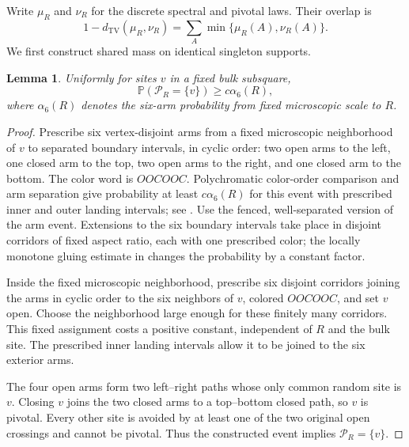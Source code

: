 \documentclass[11pt]{amsart}
\newtheorem{lemma}[theorem]{Lemma}
\theoremstyle{remark}
\newcommand{\Prob}{\mathbb P}
\newcommand{\cP}{\mathcal P}
\newcommand{\TV}{d_{\mathrm{TV}}}
\begin{document}
Write $\mu_R$ and $\nu_R$ for the discrete spectral and pivotal laws. Their overlap is
\begin{equation}\label{eq:overlap}
 1-\TV(\mu_R,\nu_R)=\sum_A\min\{\mu_R(A),\nu_R(A)\}.
\end{equation}
We first construct shared mass on identical singleton supports.

\begin{lemma}\label{lem:singlepiv}
Uniformly for sites $v$ in a fixed bulk subsquare,
\[
 \Prob(\cP_R=\{v\})\ge c\alpha_6(R),
\]
where $\alpha_6(R)$ denotes the six-arm probability from fixed microscopic scale to $R$.
\end{lemma}
\begin{proof}
Prescribe six vertex-disjoint arms from a fixed microscopic neighborhood of $v$ to separated boundary intervals, in cyclic order: two open arms to the left, one closed arm to the top, two open arms to the right, and one closed arm to the bottom. The color word is $OOCOOC$. Polychromatic color-order comparison and arm separation give probability at least $c\alpha_6(R)$ for this event with prescribed inner and outer landing intervals; see \cite[Theorem~11, equation~(4.8), Proposition~12, and Proposition~20, equation~(5.2)]{Nolin}. Use the fenced, well-separated version of the arm event. Extensions to the six boundary intervals take place in disjoint corridors of fixed aspect ratio, each with one prescribed color; the locally monotone gluing estimate in \cite[Proposition~12(1) and Lemma~13]{Nolin} changes the probability by a constant factor.

Inside the fixed microscopic neighborhood, prescribe six disjoint corridors joining the arms in cyclic order to the six neighbors of $v$, colored $OOCOOC$, and set $v$ open. Choose the neighborhood large enough for these finitely many corridors. This fixed assignment costs a positive constant, independent of $R$ and the bulk site. The prescribed inner landing intervals allow it to be joined to the six exterior arms.

The four open arms form two left--right paths whose only common random site is $v$. Closing $v$ joins the two closed arms to a top--bottom closed path, so $v$ is pivotal. Every other site is avoided by at least one of the two original open crossings and cannot be pivotal. Thus the constructed event implies $\cP_R=\{v\}$.
\end{proof}
\end{document}
